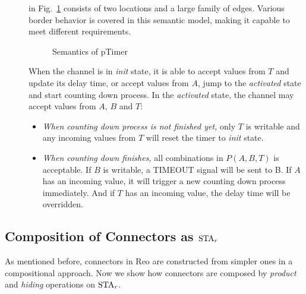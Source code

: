 \begin{description}
    \item[] in Fig.~\ref{fig:pTimer} consists of two locations and a large family of edges. Various border behavior is covered in this semantic model, making it capable to meet different requirements.
        \begin{figure}[H]
            \centering
            \resizebox{.8\textwidth}{!}{
                
            }
            \caption{Semantics of pTimer}
            \label{fig:pTimer}
        \end{figure}
    When the channel is in \emph{init} state, it is able to accept values from $T$ and update its delay time, or accept values from $A$, jump to the \emph{activated} state and start counting down process. In the \emph{activated} state, the channel may accept values from $A$, $B$ and $T$:
    \begin{itemize}
        \item \emph{When counting down process is not finished yet,} only $T$ is writable and any incoming values from $T$ will reset the timer to \emph{init} state.
        \item \emph{When counting down finishes,} all combinations in $P(A,B,T)$ is acceptable. If $B$ is writable, a TIMEOUT signal will be sent to B. If $A$ has an incoming value, it will trigger a new counting down process immediately. And if $T$ has an incoming value, the delay time will be overridden.
    \end{itemize}
\end{description}

\subsection{Composition of Connectors as $\mbox{STA}_r$}

As mentioned before, connectors in Reo are constructed from simpler ones in a compositional approach. Now we show how connectors are composed by \emph{product} and \emph{hiding} operations on $\mbox{STA}_r$.


